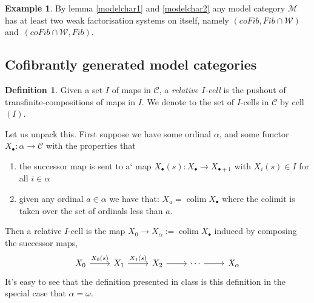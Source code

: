 \documentclass{amsart}
\DeclareMathOperator{\colim}{colim}
\theoremstyle{definition}
\newtheorem{definition}[theorem]{Definition}
\newtheorem{example}[theorem]{Example}
\begin{document}
  \begin{example}
    By lemma \ref{modelchar1} and \ref{modelchar2}
    any model category $\mathcal{M}$ has at least
    two weak factorisation systems
    on itself, namely $(coFib, Fib\cap \mathcal{W})\,$ and $\,
    (coFib\cap \mathcal{W}, Fib)$.
  \end{example}
  
  \subsection{Cofibrantly generated model categories}
  
  \begin{definition}
    Given a set $I$ of maps in $\mathcal{C}$, a \textit{relative $I$-cell}
    is the pushout of transfinite-compositions of maps in $I$. We denote
    to the set of $I$-cells in $\mathcal{C}$ by cell$(I)$.
  \end{definition}
  Let us unpack this. First suppose we have some ordinal
  $\alpha$, and some functor $X_\bullet:\alpha\to \mathcal{C}$
  with the properties that

  \begin{enumerate}
  \item the successor map is sent to a` map $X_\bullet(s):X_\bullet \to
    X_{\bullet+1}$ with $X_i(s)\in I$ for all $i\in \alpha$
  \item given any ordinal $a\in \alpha$ we have that:
    $X_a = \colim X_\bullet$ where the colimit is taken over the set
    of ordinals less than $a$.
  \end{enumerate}
  Then a relative $I$-cell is the map $X_0\to X_\alpha := \colim X_\bullet$
  induced by composing the successor maps,
  \[
    \begin{tikzcd}
      X_0\arrow[r,"X_0(s)"] & X_1 \arrow[r,"X_1(s)"] &X_2 \arrow[r]& \cdots
      \arrow[r] &X_\alpha
    \end{tikzcd}
  \]
  It's easy to see 
  that the definition presented in class is this definition in the special
  case that $\alpha= \omega$.
\end{document}
